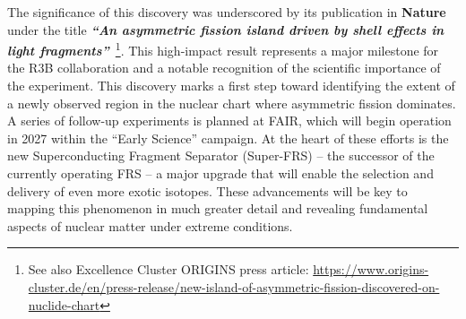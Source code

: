 The significance of this discovery was underscored by its publication in \textbf{Nature} under the title \textbf{\textit{``An asymmetric fission island driven by shell effects in light fragments''}}~\cite{morfouace2025asymmetric}\footnote{See also Excellence Cluster ORIGINS press article: \url{https://www.origins-cluster.de/en/press-release/new-island-of-asymmetric-fission-discovered-on-nuclide-chart}}. This high-impact result represents a major milestone for the R3B collaboration and a notable recognition of the scientific importance of the experiment.\newline
This discovery marks a first step toward identifying the extent of a newly observed region in the nuclear chart where asymmetric fission dominates. A series of follow-up experiments is planned at FAIR, which will begin operation in 2027 within the ``Early Science'' campaign. At the heart of these efforts is the new Superconducting Fragment Separator (Super-FRS) -- the successor of the currently operating FRS -- a major upgrade that will enable the selection and delivery of even more exotic isotopes. These advancements will be key to mapping this phenomenon in much greater detail and revealing fundamental aspects of nuclear matter under extreme conditions.\newline

\clearpage
\newpage
